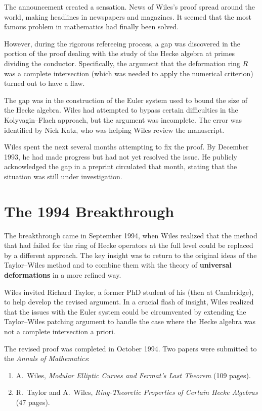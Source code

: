 The announcement created a sensation. News of Wiles's proof spread around the world, making headlines in newspapers and magazines. It seemed that the most famous problem in mathematics had finally been solved.

However, during the rigorous refereeing process, a gap was discovered in the portion of the proof dealing with the study of the Hecke algebra at primes dividing the conductor. Specifically, the argument that the deformation ring \(R\) was a complete intersection (which was needed to apply the numerical criterion) turned out to have a flaw.

The gap was in the construction of the Euler system used to bound the size of the Hecke algebra. Wiles had attempted to bypass certain difficulties in the Kolyvagin--Flach approach, but the argument was incomplete. The error was identified by Nick Katz, who was helping Wiles review the manuscript.

Wiles spent the next several months attempting to fix the proof. By December 1993, he had made progress but had not yet resolved the issue. He publicly acknowledged the gap in a preprint circulated that month, stating that the situation was still under investigation.

\section{The 1994 Breakthrough}

The breakthrough came in September 1994, when Wiles realized that the method that had failed for the ring of Hecke operators at the full level could be replaced by a different approach. The key insight was to return to the original ideas of the Taylor--Wiles method and to combine them with the theory of \textbf{universal deformations} in a more refined way.

Wiles invited Richard Taylor, a former PhD student of his (then at Cambridge), to help develop the revised argument. In a crucial flash of insight, Wiles realized that the issues with the Euler system could be circumvented by extending the Taylor--Wiles patching argument to handle the case where the Hecke algebra was not a complete intersection a priori.

The revised proof was completed in October 1994. Two papers were submitted to the \textit{Annals of Mathematics}:

\begin{enumerate}
    \item A.\ Wiles, \textit{Modular Elliptic Curves and Fermat's Last Theorem} (109 pages).
    \item R.\ Taylor and A.\ Wiles, \textit{Ring-Theoretic Properties of Certain Hecke Algebras} (47 pages).
\end{enumerate}

